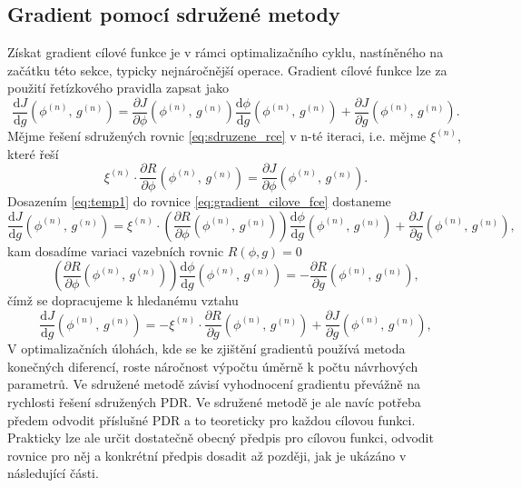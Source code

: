 \subsection{Gradient pomocí sdružené metody}
Získat gradient cílové funkce je v rámci optimalizačního cyklu, nastíněného na začátku této sekce, typicky nejnáročnější operace. Gradient cílové funkce lze za použití řetízkového pravidla zapsat jako
\begin{equation}\label{eq:gradient_cilove_fce}
\dfrac
{\mathrm{d}J}
{\mathrm{d}g} (\phi^{(n)}, \, g^{(n)})
=
\dfrac
{\partial J}
{\partial \phi }(\phi^{(n)}, \, g^{(n)})
\dfrac
{\mathrm{d}\phi}
{\mathrm{d}g}(\phi^{(n)}, \, g^{(n)})
+
\dfrac
{\partial J}
{\partial g}(\phi^{(n)}, \, g^{(n)}).
\end{equation}
Mějme řešení sdružených rovnic \ref{eq:sdruzene_rce} v n-té iteraci, i.e. mějme $ \xi^{(n)} $, které řeší
\begin{equation}\label{eq:temp1}
\xi^{(n)} \cdot \dfrac{\partial R}{\partial \phi} (\phi^{(n)}, \, g^{(n)})=\dfrac{\partial J}{\partial \phi}(\phi^{(n)}, \, g^{(n)}).
\end{equation}
Dosazením \ref{eq:temp1} do rovnice \ref{eq:gradient_cilove_fce} dostaneme 
\begin{equation}
\dfrac{\mathrm{d}J}
{\mathrm{d}g} (\phi^{(n)}, \, g^{(n)})
=
\xi^{(n)} 
\cdot 
\left(
\dfrac{\partial R}
{\partial \phi}(\phi^{(n)}, \, g^{(n)})
\right)
\dfrac{\mathrm{d}\phi}
{\mathrm{d}g}(\phi^{(n)}, \, g^{(n)})
+
\dfrac{\partial J}
{\partial g}(\phi^{(n)}, \, g^{(n)}),
\end{equation}
kam dosadíme variaci vazebních rovnic $ R(\phi,g)=0 $
\begin{equation}
\left(
\dfrac{\partial R}
{\partial \phi}(\phi^{(n)}, \, g^{(n)})
\right)
\dfrac{\mathrm{d}\phi}
{\mathrm{d}g}(\phi^{(n)}, \, g^{(n)})
=
-\dfrac{\partial R}
{\partial g}(\phi^{(n)}, \, g^{(n)}),
\end{equation}
čímž se dopracujeme k hledanému vztahu
\begin{equation}
\dfrac{\mathrm{d}J}
{\mathrm{d}g} (\phi^{(n)}, \, g^{(n)})
=
-\xi^{(n)} 
\cdot 
\dfrac{\partial R}
{\partial g}(\phi^{(n)}, \, g^{(n)})
+
\dfrac{\partial J}
{\partial g}(\phi^{(n)}, \, g^{(n)}),
\end{equation}
V optimalizačních úlohách, kde se ke zjištění gradientů používá metoda konečných diferencí, roste náročnost výpočtu úměrně k počtu návrhových parametrů. Ve sdružené metodě závisí vyhodnocení gradientu převážně na rychlosti řešení sdružených PDR. Ve sdružené metodě je ale navíc potřeba předem odvodit příslušné PDR a to teoreticky pro každou cílovou funkci. Prakticky lze ale určit dostatečně obecný předpis pro cílovou funkci, odvodit rovnice pro něj a konkrétní předpis dosadit až později, jak je ukázáno v následující části.

